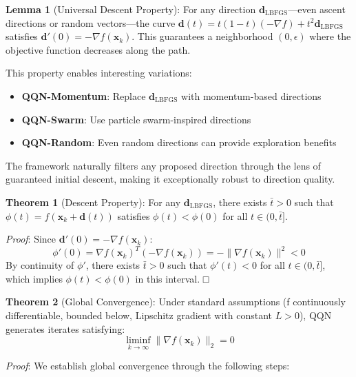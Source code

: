 \textbf{Lemma 1} (Universal Descent Property): For any direction \(\mathbf{d}_{\text{LBFGS}}\)---even ascent directions or random vectors---the curve \(\mathbf{d}(t) = t(1-t)(-\nabla f) + t^2 \mathbf{d}_{\text{LBFGS}}\) satisfies \(\mathbf{d}'(0) = -\nabla f(\mathbf{x}_k)\). This guarantees a neighborhood \((0, \epsilon)\) where the objective function decreases along the path.

This property enables interesting variations:

\begin{itemize}
\tightlist
\item
  \textbf{QQN-Momentum}: Replace \(\mathbf{d}_{\text{LBFGS}}\) with momentum-based directions
\item
  \textbf{QQN-Swarm}: Use particle swarm-inspired directions
\item
  \textbf{QQN-Random}: Even random directions can provide exploration benefits
\end{itemize}

The framework naturally filters any proposed direction through the lens of guaranteed initial descent, making it exceptionally robust to direction quality.

\textbf{Theorem 1} (Descent Property): For any \(\mathbf{d}_{\text{LBFGS}}\), there exists \(\bar{t} > 0\) such that \(\phi(t) = f(\mathbf{x}_k + \mathbf{d}(t))\) satisfies \(\phi(t) < \phi(0)\) for all \(t \in (0, \bar{t}]\).

\emph{Proof}: Since \(\mathbf{d}'(0) = -\nabla f(\mathbf{x}_k)\):
\[\phi'(0) = \nabla f(\mathbf{x}_k)^T (-\nabla f(\mathbf{x}_k)) = -\|\nabla f(\mathbf{x}_k)\|^2 < 0\]
By continuity of \(\phi'\), there exists \(\bar{t} > 0\) such that \(\phi'(t) < 0\) for all \(t \in (0, \bar{t}]\), which implies \(\phi(t) < \phi(0)\) in this interval. □

\textbf{Theorem 2} (Global Convergence): Under standard assumptions (f continuously differentiable, bounded below, Lipschitz
gradient with constant \(L > 0\)), QQN generates iterates satisfying:
\[\liminf_{k \to \infty} \|\nabla f(\mathbf{x}_k)\|_2 = 0\]

\emph{Proof}: We establish global convergence through the following steps:

